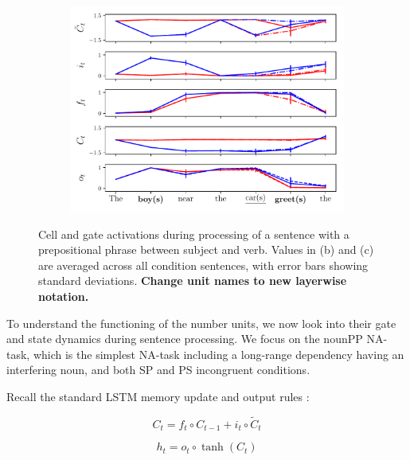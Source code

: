 \begin{figure}[ht]
\begin{subfigure}{0.32\textwidth}
    \label{fig:singular-unit}
    \end{subfigure}
    \begin{subfigure}{0.32\textwidth}
            \centering
            \includegraphics[width=\linewidth]{Figures/nounpp_775.pdf}
    \label{fig:plural-unit}
    \end{subfigure}
\caption{Cell and gate activations during processing of a sentence with a prepositional phrase between subject and verb. Values in (b) and (c) are averaged across all condition sentences, with error bars showing standard deviations. \textbf{Change unit names to new layerwise notation.}}
\end{figure}

To understand the functioning of the number units, we now look
into their gate and state dynamics during sentence processing. We
focus on the nounPP NA-task, which is the simplest NA-task including a
long-range dependency having an interfering noun, and both SP and PS
incongruent conditions.

Recall the standard LSTM memory update and output rules \cite{Hochreiter:Schmidhuber:1997}:

\begin{equation} \label{eq:update-rule}
     C_t = f_t\circ C_{t-1} + i_t\circ \widetilde{C}_t
\end{equation}

\begin{equation} \label{eq:output}
     h_t = o_t\circ \tanh(C_t)
\end{equation}

